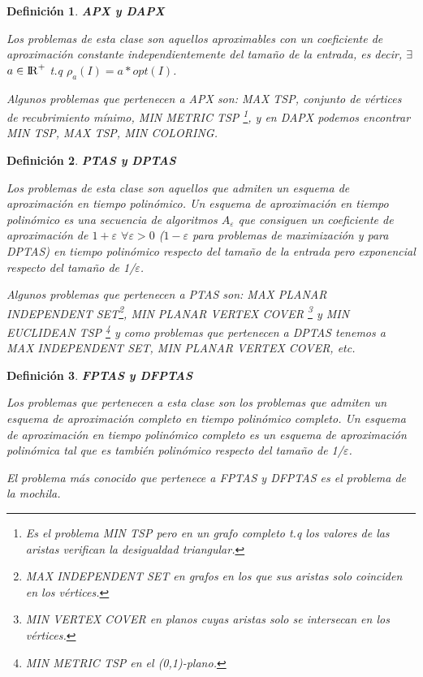 \documentclass[a4paper,12pt,titlepage]{article}
\newtheorem{defi}{Definici\'on}[section]
\begin{document}
\begin{defi}

\textbf{APX y DAPX}

Los problemas de esta clase son aquellos aproximables con un coeficiente de aproximaci\'on constante independientemente del tamaño de la entrada, es decir, $\exists$$a\in{{\rm I\!R}^{+}}$ t.q $\rho_{a}(I)=a*opt(I)$.

Algunos problemas que pertenecen a APX son: MAX TSP, conjunto de v\'ertices de recubrimiento m\'inimo, MIN METRIC TSP \footnote{Es el problema MIN TSP pero en un grafo completo t.q los valores de las aristas verifican la desigualdad triangular.}, y en DAPX podemos encontrar MIN TSP, MAX TSP, MIN COLORING.

\end{defi}

\begin{defi}

\textbf{PTAS y DPTAS}

Los problemas de esta clase son aquellos que admiten un esquema de aproximaci\'on en tiempo polin\'omico. Un esquema de aproximaci\'on en tiempo polin\'omico es una secuencia de algoritmos $A_{\varepsilon}$ que consiguen un coeficiente de aproximaci\'on de $1+\varepsilon$ $\forall\varepsilon> 0$ ($1-\varepsilon$ para problemas de maximizaci\'on y para DPTAS) en tiempo polin\'omico respecto del tamaño de la entrada pero exponencial respecto del tamaño de 1/$\varepsilon$.

Algunos problemas que pertenecen a PTAS son: MAX PLANAR INDEPENDENT SET\footnote{MAX INDEPENDENT SET en grafos en los que sus aristas solo coinciden en los v\'ertices.}, MIN PLANAR VERTEX COVER \footnote{MIN VERTEX COVER en planos cuyas aristas solo se intersecan en los v\'ertices.} y MIN EUCLIDEAN TSP \footnote{MIN METRIC TSP en el (0,1)-plano.} y como problemas que pertenecen a DPTAS tenemos a MAX INDEPENDENT SET, MIN PLANAR VERTEX COVER, etc.

\end{defi}

\begin{defi}

\textbf{FPTAS y DFPTAS}

Los problemas que pertenecen a esta clase son los problemas que admiten un esquema de aproximaci\'on completo en tiempo polin\'omico completo. Un esquema de aproximaci\'on en tiempo polin\'omico completo es un esquema de aproximaci\'on polin\'omica tal que es tambi\'en polin\'omico respecto del tamaño de 1/$\varepsilon$.

El problema m\'as conocido que pertenece a FPTAS y DFPTAS es el problema de la mochila.

\end{defi}
\end{document}
